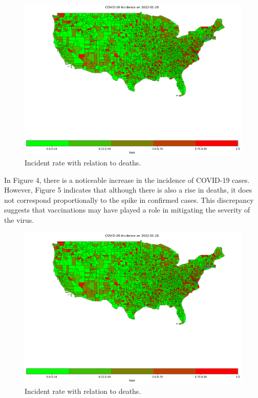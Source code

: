 \documentclass[sigconf,screen,nonacm]{acmart}
\begin{document}
\begin{figure}[H]
  \centering
  \includegraphics[width=1\linewidth]{Figures/IncidenceDeathRate_2022-01-26.png}
  \caption{Incident rate with relation to deaths.}
\end{figure}
\noindent
In Figure 4, there is a noticeable increase in the incidence of COVID-19 cases. However, Figure 5 indicates that although there is also a rise in deaths, it does not correspond proportionally to the spike in confirmed cases. This discrepancy suggests that vaccinations may have played a role in mitigating the severity of the virus.
\begin{figure}[H]
  \centering
  \includegraphics[width=1\linewidth]{Figures/IncidenceDeathRate_2022-01-26.png}
  \caption{Incident rate with relation to deaths.}
\end{figure}
\end{document}
